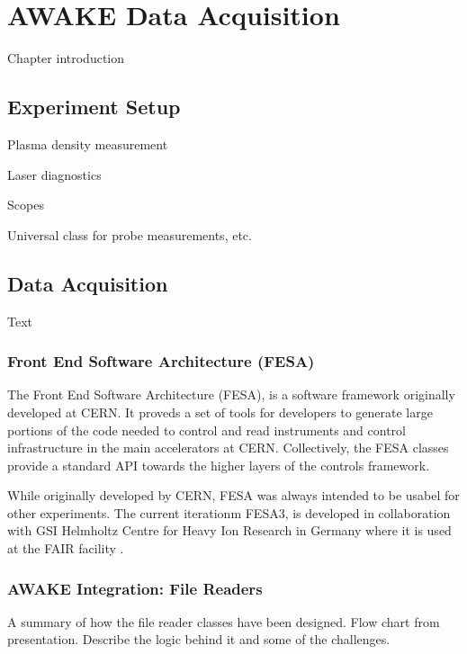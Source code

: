 %
%

\chapter{AWAKE Data Acquisition}
\label{Ch:DAQ}

Chapter introduction

\section{Experiment Setup}
\label{DAQ:Experiment}

Plasma density measurement \cite{oz:2016}

Laser diagnostics \cite{salin:1987}

Scopes

Universal class for probe measurements, etc.

\section{Data Acquisition}
\label{DAQ:DAQ}

Text

\subsection{Front End Software Architecture (FESA)}
\label{DAQ:FESA}

The Front End Software Architecture (FESA), is a software framework originally developed at CERN. It proveds a set of tools for developers to generate large portions of the code needed to control and read instruments and control infrastructure in the main accelerators at CERN. Collectively, the FESA classes provide a standard API towards the higher layers of the controls framework.

While originally developed by CERN, FESA was always intended to be usabel for other experiments. The current iterationm FESA3, is developed in collaboration with GSI Helmholtz Centre for Heavy Ion Research in Germany where it is used at the FAIR facility \cite{schwinn:2010}.

\subsection{AWAKE Integration: File Readers}
\label{DAQ:Integration}

A summary of how the file reader classes have been designed. Flow chart from presentation. Describe the logic behind it and some of the challenges.

